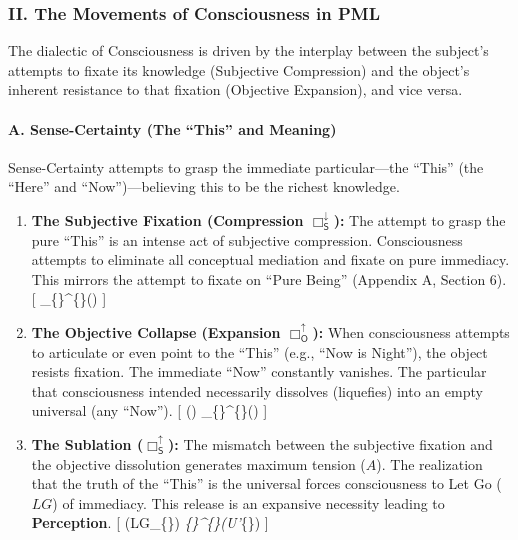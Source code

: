 \subsubsection{II. The Movements of Consciousness in PML}\label{ii.-the-movements-of-consciousness-in-pml}

The dialectic of Consciousness is driven by the interplay between the subject's attempts to fixate its knowledge (Subjective Compression) and the object's inherent resistance to that fixation (Objective Expansion), and vice versa.

\paragraph{A. Sense-Certainty (The ``This'' and Meaning)}\label{a.-sense-certainty-the-this-and-meaning}

Sense-Certainty attempts to grasp the immediate particular---the ``This'' (the ``Here'' and ``Now'')---believing this to be the richest knowledge.

\begin{enumerate}
\def\labelenumi{\arabic{enumi}.}
\tightlist
\item
  \textbf{The Subjective Fixation (Compression \(\Box_{\mathsf{S}}^{\downarrow}\)):} The attempt to grasp the pure ``This'' is an intense act of subjective compression. Consciousness attempts to eliminate all conceptual mediation and fixate on pure immediacy. This mirrors the attempt to fixate on ``Pure Being'' (Appendix A, Section 6). {[} \Box\_\{\}\^{}\{\downarrow\}() {]}
\item
  \textbf{The Objective Collapse (Expansion \(\Box_{\mathsf{O}}^{\uparrow}\)):} When consciousness attempts to articulate or even point to the ``This'' (e.g., ``Now is Night''), the object resists fixation. The immediate ``Now'' constantly vanishes. The particular that consciousness intended necessarily dissolves (liquefies) into an empty universal (any ``Now''). {[} () \implies \Box\_\{\}\^{}\{\uparrow\}() {]}
\item
  \textbf{The Sublation (\(\Box_{\mathsf{S}}^{\uparrow}\)):} The mismatch between the subjective fixation and the objective dissolution generates maximum tension (\(A\)). The realization that the truth of the ``This'' is the universal forces consciousness to Let Go (\(LG\)) of immediacy. This release is an expansive necessity leading to \textbf{Perception}. {[} (LG\_\{\}) \implies \Box\emph{\{\}\^{}\{\uparrow\}(U'}\{\}) {]}
\end{enumerate}

